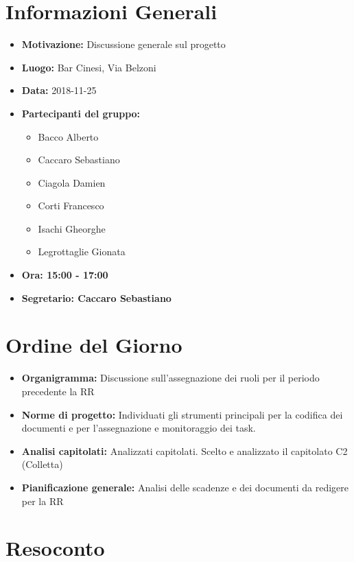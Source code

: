 \documentclass[a4paper, oneside, openany, dvipsnames, table]{article}
\begin{document}
\copertina{}


\newpage
\tableofcontents
\newpage

\section{Informazioni Generali}
\begin{itemize}
\item \textbf{Motivazione:} Discussione generale sul progetto
\item \textbf{Luogo:} Bar Cinesi, Via Belzoni
\item \textbf{Data:} 2018-11-25
\item \textbf{Partecipanti del gruppo:}
	\begin{itemize}
	\item Bacco Alberto
	\item Caccaro Sebastiano
	\item Ciagola Damien
	\item Corti Francesco
	\item Isachi Gheorghe
	\item Legrottaglie Gionata
	\end{itemize} 
\item \textbf{Ora: 15:00 - 17:00}
\item \textbf{Segretario: Caccaro Sebastiano}
\end{itemize}

\section{Ordine del Giorno}
\begin{itemize}
\item \textbf{Organigramma:} Discussione sull'assegnazione dei ruoli per il periodo precedente la RR
\item \textbf{Norme di progetto:} Individuati gli strumenti principali per la codifica dei documenti e per l'assegnazione e monitoraggio dei task.
\item \textbf{Analisi capitolati:} Analizzati capitolati. Scelto e analizzato il capitolato C2 (Colletta)
\item \textbf{Pianificazione generale:} Analisi delle scadenze e dei documenti da redigere per la RR
\end{itemize}

\section{Resoconto}
\end{document}
